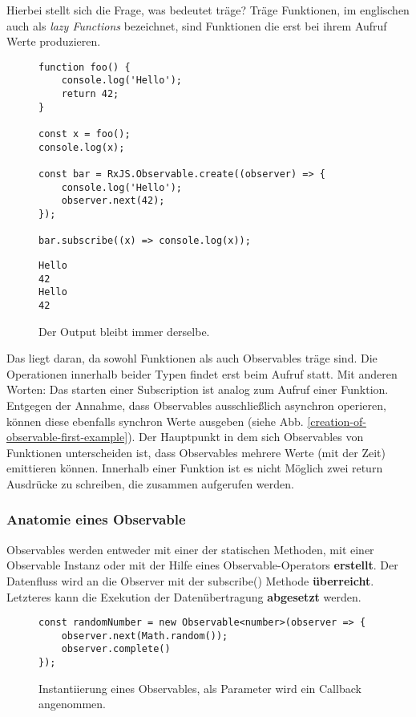 \noindent
Hierbei stellt sich die Frage, was bedeutet träge? Träge Funktionen, im englischen auch als \textit{lazy Functions} bezeichnet, sind Funktionen die erst bei ihrem Aufruf Werte produzieren\cite{lazy-functions}.

\begin{figure}[H]
\begin{lstlisting}[basicstyle=\small]
function foo() {
    console.log('Hello');
    return 42;
}

const x = foo();
console.log(x);

const bar = RxJS.Observable.create((observer) => {
    console.log('Hello');
    observer.next(42);
});

bar.subscribe((x) => console.log(x));
\end{lstlisting}
\end{figure}

\begin{figure}[H]
\begin{lstlisting}
Hello
42
Hello
42
\end{lstlisting}
\caption{Der Output bleibt immer derselbe.}
\end{figure}

\noindent
Das liegt daran, da sowohl Funktionen als auch Observables träge sind. Die Operationen innerhalb beider Typen findet erst beim Aufruf statt. Mit anderen Worten: Das starten einer Subscription ist analog zum Aufruf einer Funktion. Entgegen der Annahme, dass Observables ausschließlich asynchron operieren, können diese ebenfalls synchron Werte ausgeben (siehe Abb. \ref{creation-of-observable-first-example}). Der Hauptpunkt in dem sich Observables von Funktionen unterscheiden ist, dass Observables mehrere Werte (mit der Zeit) emittieren können. Innerhalb einer Funktion ist es nicht Möglich zwei return Ausdrücke zu schreiben, die zusammen aufgerufen werden.

\subsubsection{Anatomie eines Observable}
Observables werden entweder mit einer der statischen Methoden, mit einer Observable Instanz oder mit der Hilfe eines Observable-Operators \textbf{erstellt}. Der Datenfluss wird an die Observer mit der subscribe() Methode \textbf{überreicht}. Letzteres kann die Exekution der Datenübertragung \textbf{abgesetzt} werden.

\begin{figure}[H]
\begin{lstlisting}[basicstyle=\small]
const randomNumber = new Observable<number>(observer => {
    observer.next(Math.random());
    observer.complete()
});
\end{lstlisting}
\caption{Instantiierung eines Observables, als Parameter wird ein Callback angenommen.}
\end{figure}


